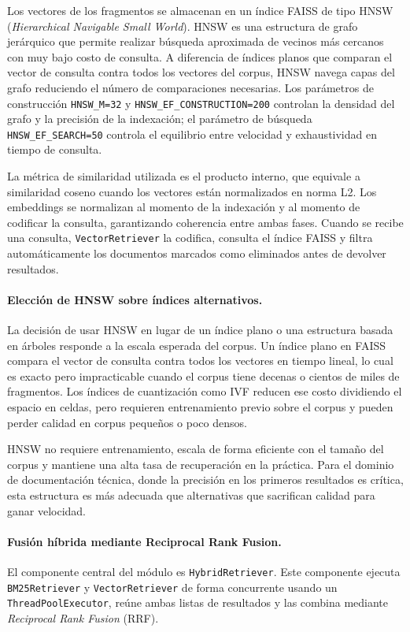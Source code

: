 \documentclass[11pt]{article}
\begin{document}
Los vectores de los fragmentos se almacenan en un índice FAISS de tipo HNSW
(\emph{Hierarchical Navigable Small World}). HNSW es una estructura de grafo jerárquico que
permite realizar búsqueda aproximada de vecinos más cercanos con muy bajo costo de consulta.
A diferencia de índices planos que comparan el vector de consulta contra todos los vectores del
corpus, HNSW navega capas del grafo reduciendo el número de comparaciones necesarias. Los
parámetros de construcción \texttt{HNSW\_M=32} y \texttt{HNSW\_EF\_CONSTRUCTION=200}
controlan la densidad del grafo y la precisión de la indexación; el parámetro de búsqueda
\texttt{HNSW\_EF\_SEARCH=50} controla el equilibrio entre velocidad y exhaustividad en tiempo
de consulta.

La métrica de similaridad utilizada es el producto interno, que equivale a similaridad coseno
cuando los vectores están normalizados en norma L2. Los embeddings se normalizan al momento de
la indexación y al momento de codificar la consulta, garantizando coherencia entre ambas fases.
Cuando se recibe una consulta, \texttt{VectorRetriever} la codifica, consulta el índice FAISS
y filtra automáticamente los documentos marcados como eliminados antes de devolver resultados.

\paragraph{Elección de HNSW sobre índices alternativos.}
La decisión de usar HNSW en lugar de un índice plano o una estructura basada en árboles
responde a la escala esperada del corpus. Un índice plano en FAISS compara el vector de consulta
contra todos los vectores en tiempo lineal, lo cual es exacto pero impracticable cuando el corpus
tiene decenas o cientos de miles de fragmentos. Los índices de cuantización como IVF reducen ese
costo dividiendo el espacio en celdas, pero requieren entrenamiento previo sobre el corpus y
pueden perder calidad en corpus pequeños o poco densos.

HNSW no requiere entrenamiento, escala de forma eficiente con el tamaño del corpus y mantiene
una alta tasa de recuperación en la práctica. Para el dominio de documentación técnica, donde la
precisión en los primeros resultados es crítica, esta estructura es más adecuada que alternativas
que sacrifican calidad para ganar velocidad.

\paragraph{Fusión híbrida mediante Reciprocal Rank Fusion.}
El componente central del módulo es \texttt{HybridRetriever}. Este componente ejecuta
\texttt{BM25Retriever} y \texttt{VectorRetriever} de forma concurrente usando un
\texttt{ThreadPoolExecutor}, reúne ambas listas de resultados y las combina mediante
\emph{Reciprocal Rank Fusion} (RRF).
\end{document}
